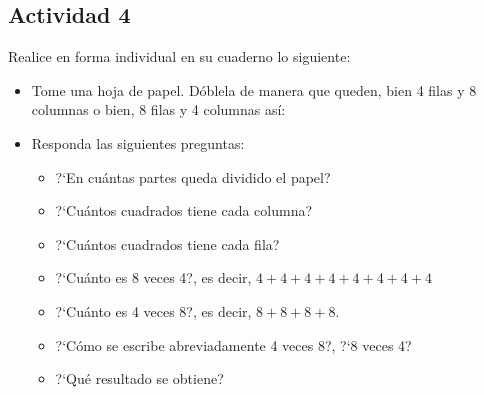 \documentclass[10pt,twoside]{article}
\begin{document}
\subsection*{Actividad 4}
Realice en forma individual en su cuaderno lo siguiente:
\begin{itemize}
 \item Tome una hoja de papel. D\'oblela de manera que queden, bien 4 filas y 8 columnas o bien, 8 filas y 4 columnas as\'i:

\item Responda las siguientes preguntas:
\begin{itemize}
 \item ?`En cu\'antas partes queda dividido el papel?
\item ?`Cu\'antos cuadrados tiene cada columna?
\item ?`Cu\'antos cuadrados tiene cada fila?
\item ?`Cu\'anto es 8 veces 4?, es decir, $4+4+4+4+4+4+4+4$
\item ?`Cu\'anto es 4 veces 8?, es decir, $8+8+8+8$.
\item ?`C\'omo se escribe abreviadamente 4 veces 8?, ?`8 veces 4?
\item ?`Qu\'e resultado se obtiene?
\end{itemize}
\end{itemize}
\end{document}
